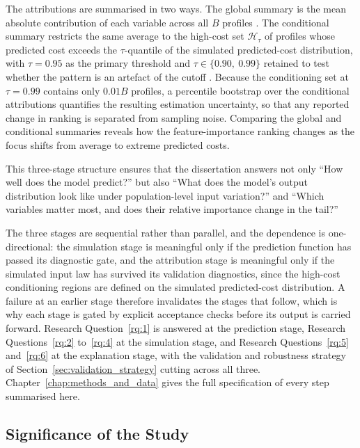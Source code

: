 The attributions are summarised in two ways.  The global summary is the
mean absolute contribution of each variable across all $B$ profiles
\citep{lundberg2020local}.  The conditional summary restricts the same
average to the high-cost set $\mathcal{H}_{\tau}$ of profiles whose
predicted cost exceeds the $\tau$-quantile of the simulated
predicted-cost distribution, with $\tau = 0.95$ as the primary threshold
and $\tau \in \{0.90,\ 0.99\}$ retained to test whether the pattern is an
artefact of the cutoff \citep{mcneil2015quantitative}.  Because the
conditioning set at $\tau = 0.99$ contains only $0.01B$ profiles, a
percentile bootstrap over the conditional attributions quantifies the
resulting estimation uncertainty, so that any reported change in ranking
is separated from sampling noise.  Comparing the global and conditional
summaries reveals how the feature-importance ranking changes as the focus
shifts from average to extreme predicted costs.

This three-stage structure ensures that the dissertation answers not only
``How well does the model predict?'' but also ``What does the model's
output distribution look like under population-level input variation?''
and ``Which variables matter most, and does their relative importance
change in the tail?''

The three stages are sequential rather than parallel, and the dependence
is one-directional: the simulation stage is meaningful only if the
prediction function has passed its diagnostic gate, and the attribution
stage is meaningful only if the simulated input law has survived its
validation diagnostics, since the high-cost conditioning regions are
defined on the simulated predicted-cost distribution.  A failure at an
earlier stage therefore invalidates the stages that follow, which is why
each stage is gated by explicit acceptance checks before its output is
carried forward.  Research Question~\ref{rq:1} is answered at the
prediction stage, Research Questions~\ref{rq:2} to~\ref{rq:4} at the
simulation stage, and Research Questions~\ref{rq:5}
and~\ref{rq:6} at the explanation stage, with the validation and
robustness strategy of Section~\ref{sec:validation_strategy} cutting
across all three.  Chapter~\ref{chap:methods_and_data} gives the full
specification of every step summarised here.


\subsection{Significance of the Study}
\label{sec:significance}

